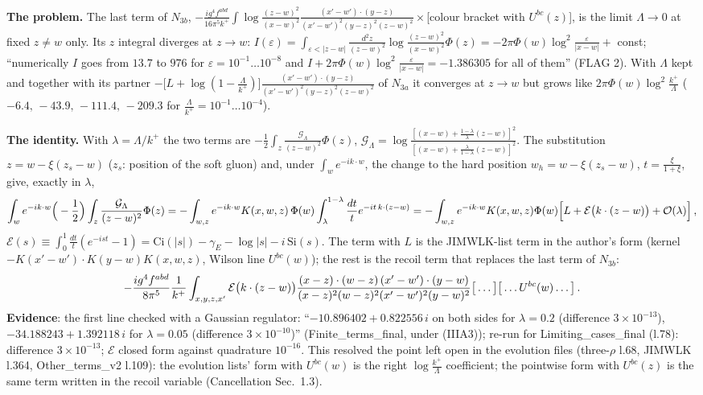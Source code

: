 \documentclass[10pt]{article}
\begin{document}
\noindent\textbf{The problem.} The last term of $N_{3b}$, $-\frac{ig^{4}f^{abd}}{16\pi^{5}k^{+}}\int\log\frac{(z-w)^{2}}{(x-w)^{2}}\frac{(x'-w')\cdot(y-z)}{(x'-w')^{2}(y-z)^{2}(z-w)^{2}}\times$[colour bracket with $U^{bc}(z)$], is the limit $\Lambda\to0$ at fixed $z\neq w$ only. Its $z$ integral diverges at $z\to w$: $I(\varepsilon)=\int_{\varepsilon<|z-w|}\frac{d^{2}z}{(z-w)^{2}}\log\frac{(z-w)^{2}}{(x-w)^{2}}\Phi(z)=-2\pi\Phi(w)\log^{2}\frac{\varepsilon}{|x-w|}+$ const; ``numerically $I$ goes from $13.7$ to $976$ for $\varepsilon=10^{-1}\dots10^{-8}$ and $I+2\pi\Phi(w)\log^{2}\frac{\varepsilon}{|x-w|}=-1.386305$ for all of them'' (FLAG 2). With $\Lambda$ kept and together with its partner $-\big[L+\log(1-\frac{\Lambda}{k^{+}})\big]\frac{(x'-w')\cdot(y-z)}{(x'-w')^{2}(y-z)^{2}(z-w)^{2}}$ of $N_{3a}$ it converges at $z\to w$ but grows like $2\pi\Phi(w)\log^{2}\frac{k^{+}}{\Lambda}$ ($-6.4,\,-43.9,\,-111.4,\,-209.3$ for $\frac{\Lambda}{k^{+}}=10^{-1}\dots10^{-4}$).

\noindent\textbf{The identity.} With $\lambda=\Lambda/k^{+}$ the two terms are $-\frac12\int_{z}\frac{\mathcal{G}_{\Lambda}}{(z-w)^{2}}\Phi(z)$, $\mathcal{G}_{\Lambda}=\log\frac{[(x-w)+\frac{1-\lambda}{\lambda}(z-w)]^{2}}{[(x-w)+\frac{\lambda}{1-\lambda}(z-w)]^{2}}$. The substitution $z=w-\xi(z_{s}-w)$ ($z_{s}$: position of the soft gluon) and, under $\int_{w}e^{-ik\cdot w}$, the change to the hard position $w_{h}=w-\xi(z_{s}-w)$, $t=\frac{\xi}{1+\xi}$, give, exactly in $\lambda$,
\begin{align}
\int_{w}e^{-ik\cdot w}\Big(-\frac12\Big)\int_{z}\frac{\mathcal{G}_{\Lambda}}{(z-w)^{2}}\Phi(z)=-\int_{w,z}e^{-ik\cdot w}K(x,w,z)\,\Phi(w)\int_{\lambda}^{1-\lambda}\frac{dt}{t}e^{-it\,k\cdot(z-w)}
=-\int_{w,z}e^{-ik\cdot w}K(x,w,z)\Phi(w)\Big[L+\mathcal{E}\big(k\cdot(z-w)\big)+{\cal O}(\lambda)\Big]\,,\notag
\end{align}
$\mathcal{E}(s)\equiv\int_{0}^{1}\frac{dt}{t}(e^{-ist}-1)=\mathrm{Ci}(|s|)-\gamma_{E}-\log|s|-i\,\mathrm{Si}(s)$. The term with $L$ is the JIMWLK-list term in the author's form (kernel $-K(x'-w')\cdot K(y-w)K(x,w,z)$, Wilson line $U^{bc}(w)$); the rest is the recoil term that replaces the last term of $N_{3b}$:
\begin{align}
-\frac{ig^{4}f^{abd}}{8\pi^{5}}\frac{1}{k^{+}}\int_{x,y,z,x'}\mathcal{E}\big(k\cdot(z-w)\big)\frac{(x-z)\cdot(w-z)\,(x'-w')\cdot(y-w)}{(x-z)^{2}(w-z)^{2}(x'-w')^{2}(y-w)^{2}}\big[\dots\big]\big[\dots U^{bc}(w)\dots\big]\,.\notag
\end{align}
\textbf{Evidence}: the first line checked with a Gaussian regulator: ``$-10.896402+0.822556\,i$ on both sides for $\lambda=0.2$ (difference $3\times10^{-13}$), $-34.188243+1.392118\,i$ for $\lambda=0.05$ (difference $3\times10^{-10}$)'' (Finite\_terms\_final, under (IIIA3)); re-run for Limiting\_cases\_final (l.78): difference $3\times10^{-13}$; $\mathcal{E}$ closed form against quadrature $10^{-16}$. This resolved the point left open in the evolution files (three-$\rho$ l.68, JIMWLK l.364, Other\_terms\_v2 l.109): the evolution lists' form with $U^{bc}(w)$ is the right $\log\frac{k^{+}}{\Lambda}$ coefficient; the pointwise form with $U^{bc}(z)$ is the same term written in the recoil variable (Cancellation Sec.~1.3).
\end{document}
